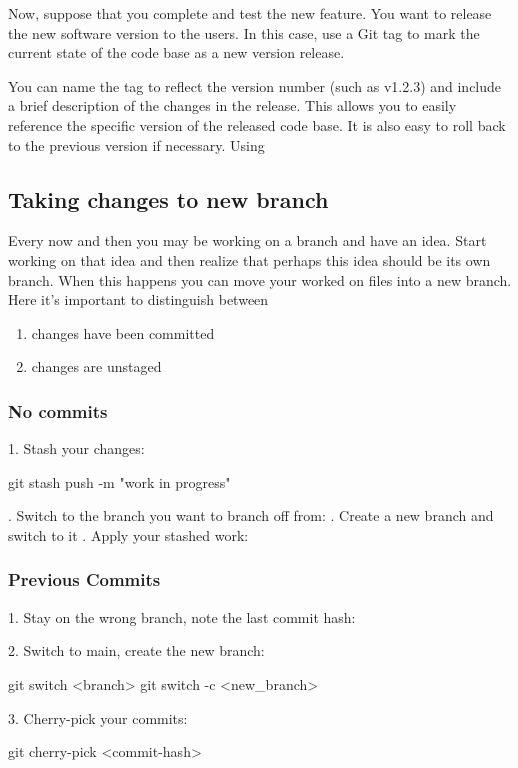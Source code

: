 Now, suppose that you complete and test the new feature. You want to release the new software version to the users. In this case, use a Git tag to mark the current state of the code base as a new version release.

You can name the tag to reflect the version number (such as v1.2.3) and include a brief description of the changes in the release. This allows you to easily reference the specific version of the released code base. It is also easy to roll back to the previous version if necessary.
Using 

\subsection{Taking changes to new branch}
Every now and then you may be working on a branch and have an idea. Start working on that idea and then realize that perhaps this idea should be its own branch. When this happens you can move your worked on files into a new branch. Here it's important to distinguish between 
\begin{enumerate}
    \item changes have been committed
    \item changes are unstaged
\end{enumerate}

\subsubsection{No commits}
1. Stash your changes: \footnotemark
\begin{gitBashBox}
git stash push -m "work in progress"
\end{gitBashBox}. Switch to the branch you want to branch off from: . Create a new branch and switch to it . Apply your stashed work: 


\subsubsection{Previous Commits}
1. Stay on the wrong branch, note the last commit hash: 

2. Switch to main, create the new branch:
\begin{gitBashBox}
    git switch <branch>
    git switch -c <new_branch>
\end{gitBashBox}

3. Cherry-pick your commits:
\begin{gitBashBox}
    git cherry-pick <commit-hash>
\end{gitBashBox}

